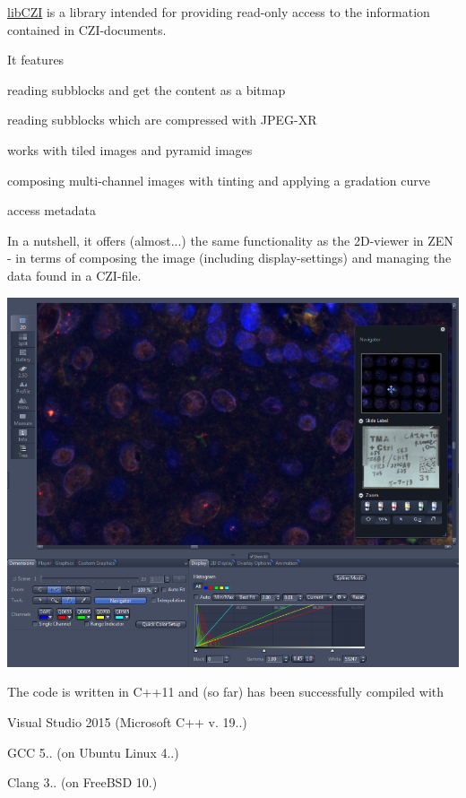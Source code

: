 \hyperlink{namespacelib_c_z_i}{lib\+C\+ZI} is a library intended for providing read-\/only access to the information contained in C\+Z\+I-\/documents.

It features
\begin{DoxyItemize}
\item reading subblocks and get the content as a bitmap
\item reading subblocks which are compressed with J\+P\+E\+G-\/\+XR
\item works with tiled images and pyramid images
\item composing multi-\/channel images with tinting and applying a gradation curve
\item access metadata
\end{DoxyItemize}

In a nutshell, it offers (almost...) the same functionality as the 2\+D-\/viewer in Z\+EN -\/ in terms of composing the image (including display-\/settings) and managing the data found in a C\+Z\+I-\/file.


\begin{DoxyImage}
\includegraphics[width=\textwidth,height=\textheight/2,keepaspectratio=true]{ZEN_screenshot_1.PNG}
\end{DoxyImage}
 The code is written in C++11 and (so far) has been successfully compiled with
\begin{DoxyItemize}
\item Visual Studio 2015 (Microsoft C++ v. 19..)
\item G\+CC 5.. (on Ubuntu Linux 4..)
\item Clang 3.. (on Free\+B\+SD 10.)
\end{DoxyItemize}

